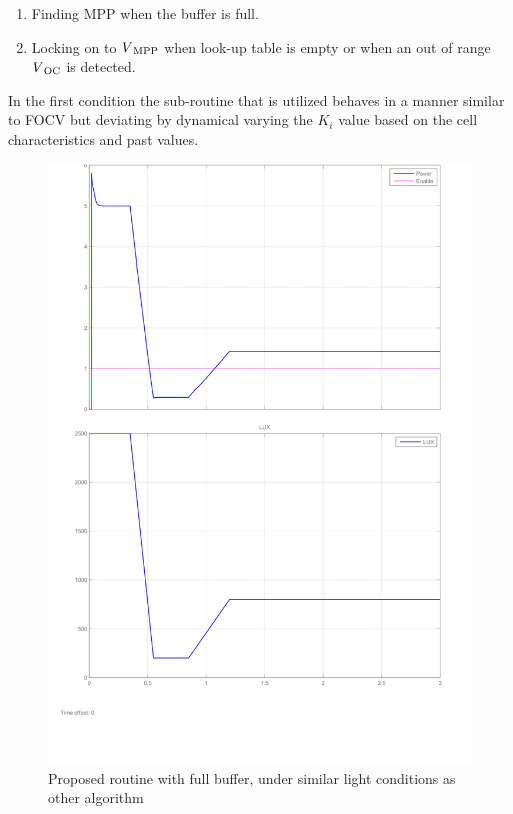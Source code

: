 	\begin{enumerate}
		\item Finding \ac{MPP} when the buffer is full.
		\item Locking on to $V\textsubscript{MPP}$ when look-up table is empty or when an out of range $V\textsubscript{OC}$ is detected.				
	\end{enumerate}
In the first condition the sub-routine that is utilized behaves in a manner similar to \ac{FOCV} but deviating by dynamical varying the $K_{i}$ value based on the cell characteristics and past values.    
   \begin{figure}[H]
  	  \begin{center}
  		  \includegraphics[width=\textwidth]{images/Proposed_algo-1}
  		  \caption{Proposed routine with full buffer, under similar light conditions as other algorithm}
  		  \label{fig:Frac_oc_result}
  	  \end{center}
    \end{figure}

